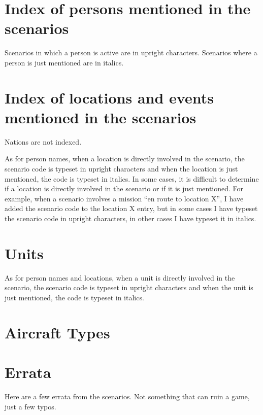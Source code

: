 \documentclass[a4paper,twocolumn]{article}
\begin{document}
\section*{Index of persons mentioned in the scenarios}

Scenarios in which a person is active are in upright characters.
Scenarios where a person is just mentioned are in italics.

\vspace{3mm}


\section*{Index of locations and events mentioned in the scenarios}

Nations are not indexed.

\vspace{3mm}

As for person names, when a location is directly involved in the
scenario, the scenario code is typeset in upright characters and when
the location is just mentioned, the code is typeset in italics.
In some cases, it is difficult to determine if a location is directly
involved in the scenario or if it is just mentioned. For example, when
a scenario involves a mission ``en route to location X'', I have
added the scenario code to the location X entry, but in some cases I have
typeset the scenario code in upright characters, in other cases I have
typeset it in italics.

\vspace{3mm}


\section*{Units}

\vspace{3mm}

As for person names and locations, when a unit is directly involved in the
scenario, the scenario code is typeset in upright characters and when
the unit is just mentioned, the code is typeset in italics.

\vspace{3mm}


\section*{Aircraft Types}

\vspace{3mm}


\section*{Errata}

Here are a few errata from the scenarios. Not something that can ruin a game, just
a few typos.

\vspace{3mm}

\end{document}
